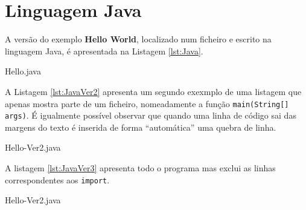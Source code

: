 \chapter{Linguagem Java}
\label{ch:LangJava}

A versão do exemplo \textbf{Hello World}, localizado num ficheiro e escrito na linguagem Java, é apresentada na Listagem \ref{lst:Java}.


{Hello.java}

A Listagem \ref{lst:JavaVer2} apresenta um segundo exexmplo de uma listagem que apenas mostra parte de um ficheiro, nomeadamente a função \texttt{main(String[] args)}. É igualmente possível observar que quando uma linha de código sai das 
margens do texto é inserida de forma ``automática'' uma quebra de linha.


{Hello-Ver2.java}

A listagem \ref{lst:JavaVer3} apresenta todo o programa mas exclui as linhas correspondentes aos \texttt{import}.


{Hello-Ver2.java}
